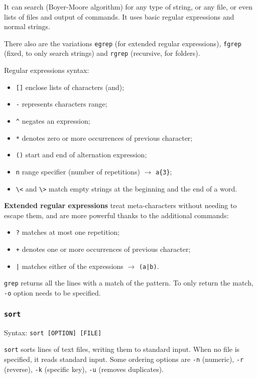 It can search (Boyer-Moore algorithm) for any type of string, or any file, or even lists of files and output of commands. It uses basic regular expressions and normal strings.

There also are the variations \texttt{egrep} (for extended regular expressions), \texttt{fgrep} (fixed, to only search strings) and \texttt{rgrep} (recursive, for folders).

Regular expressions syntax:
\begin{itemize}
	\item \texttt{[]} enclose lists of characters (and);
	\item \texttt{-} represents characters range;
	\item \texttt{\^} negates an expression;
	\item \texttt{*} denotes zero or more occurrences of previous character;
	\item \texttt{()} start and end of alternation expression;
	\item \texttt{{n}} range specifier (number of repetitions) $\rightarrow$ \texttt{a\{3\}};
	\item \texttt{\textbackslash<} and \texttt{\textbackslash>} match empty strings at the beginning and the end of a word.
\end{itemize}

\textbf{Extended regular expressions} treat meta-characters without needing to escape them, and are more powerful thanks to the additional commands:
\begin{itemize}
	\item \texttt{?} matches at most one repetition;
	\item \texttt{+} denotes one or more occurrences of previous character;
	\item \texttt{|} matches either of the expressions $\rightarrow$ \texttt{(a|b)}.
\end{itemize}

\texttt{grep} returns all the lines with a match of the pattern. To only return the match, \texttt{-o} option needs to be specified.

\subsubsection{\texttt{sort}}
Syntax: \texttt{sort [OPTION] [FILE]}

\texttt{sort} sorts lines of text files, writing them to standard input. When no file is specified, it reads standard input. Some ordering options are \texttt{-n} (numeric), \texttt{-r} (reverse), \texttt{-k} (specific key), \texttt{-u} (removes duplicates).

